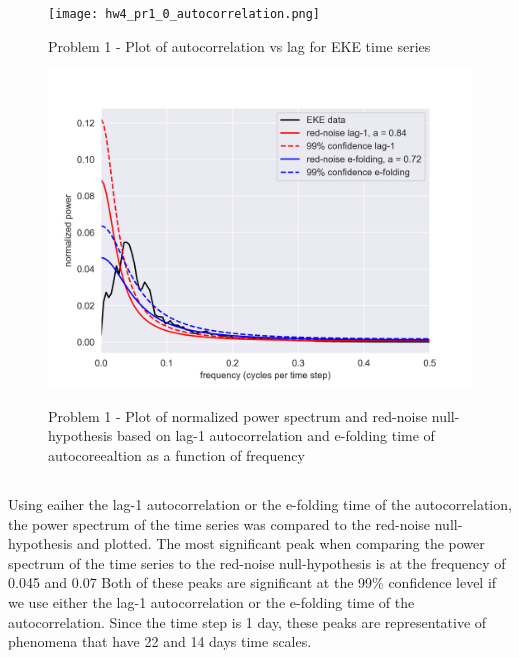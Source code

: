 \documentclass[12pt]{article}
\begin{document}
\begin{figure}
\begin{center}
\texttt{[image: hw4\_pr1\_0\_autocorrelation.png]}
\caption{Problem 1 - Plot of autocorrelation vs lag for EKE time series}{\label{fig:problem-1-a}}
\end{center}
\end{figure}

\begin{figure}
\begin{center}
\includegraphics[width=6in]{hw4_pr1_3_power_spectrum_e_folding.png}
\caption{Problem 1 - Plot of normalized power spectrum and red-noise null-hypothesis based on lag-1 autocorrelation and e-folding time of autocoreealtion as a function of frequency}{\label{fig:problem-1-a}}
\end{center}
\end{figure}


\subsection{}\label{subsec:problem-1-d}
Using eaiher the lag-1 autocorrelation or the e-folding time of the autocorrelation, the power spectrum of the time series was compared to the red-noise null-hypothesis and plotted.
The most significant peak when comparing the power spectrum of the time series to the red-noise null-hypothesis is at the frequency of 0.045 and 0.07 Both of these peaks are significant at the 99\% confidence level if we use either the lag-1 autocorrelation or the e-folding time of the autocorrelation.
Since the time step is 1 day, these peaks are representative of phenomena that have 22 and 14 days time scales.
\end{document}

